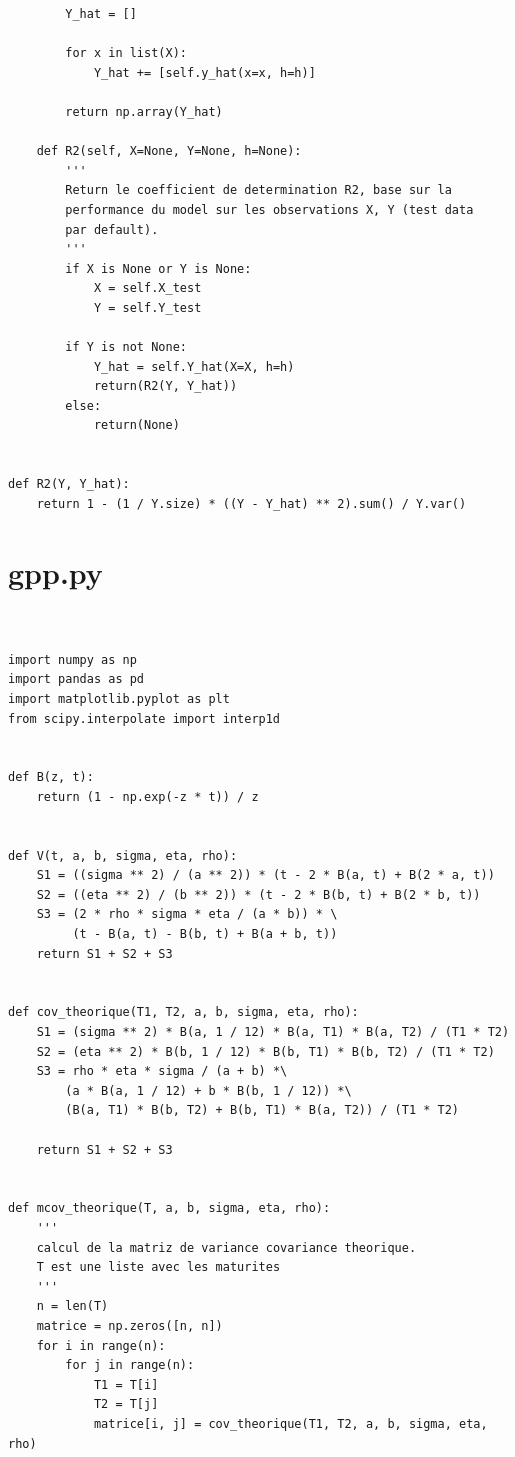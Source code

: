 \documentclass[12pt, a4paper]{book}
\begin{document}
{\begin{small}
\begin{verbatim}
        Y_hat = []

        for x in list(X):
            Y_hat += [self.y_hat(x=x, h=h)]

        return np.array(Y_hat)

    def R2(self, X=None, Y=None, h=None):
        '''
        Return le coefficient de determination R2, base sur la
        performance du model sur les observations X, Y (test data
        par default).
        '''
        if X is None or Y is None:
            X = self.X_test
            Y = self.Y_test

        if Y is not None:
            Y_hat = self.Y_hat(X=X, h=h)
            return(R2(Y, Y_hat))
        else:
            return(None)


def R2(Y, Y_hat):
    return 1 - (1 / Y.size) * ((Y - Y_hat) ** 2).sum() / Y.var()
\end{verbatim}
\end{small}

\section{gpp.py} \label{gpp.py}
\begin{small}
\begin{verbatim}


import numpy as np
import pandas as pd
import matplotlib.pyplot as plt
from scipy.interpolate import interp1d


def B(z, t):
    return (1 - np.exp(-z * t)) / z


def V(t, a, b, sigma, eta, rho):
    S1 = ((sigma ** 2) / (a ** 2)) * (t - 2 * B(a, t) + B(2 * a, t))
    S2 = ((eta ** 2) / (b ** 2)) * (t - 2 * B(b, t) + B(2 * b, t))
    S3 = (2 * rho * sigma * eta / (a * b)) * \
         (t - B(a, t) - B(b, t) + B(a + b, t))
    return S1 + S2 + S3


def cov_theorique(T1, T2, a, b, sigma, eta, rho):
    S1 = (sigma ** 2) * B(a, 1 / 12) * B(a, T1) * B(a, T2) / (T1 * T2)
    S2 = (eta ** 2) * B(b, 1 / 12) * B(b, T1) * B(b, T2) / (T1 * T2)
    S3 = rho * eta * sigma / (a + b) *\
        (a * B(a, 1 / 12) + b * B(b, 1 / 12)) *\
        (B(a, T1) * B(b, T2) + B(b, T1) * B(a, T2)) / (T1 * T2)

    return S1 + S2 + S3


def mcov_theorique(T, a, b, sigma, eta, rho):
    '''
    calcul de la matriz de variance covariance theorique.
    T est une liste avec les maturites
    '''
    n = len(T)
    matrice = np.zeros([n, n])
    for i in range(n):
        for j in range(n):
            T1 = T[i]
            T2 = T[j]
            matrice[i, j] = cov_theorique(T1, T2, a, b, sigma, eta, rho)


\end{verbatim}
\end{small}}
\end{document}
